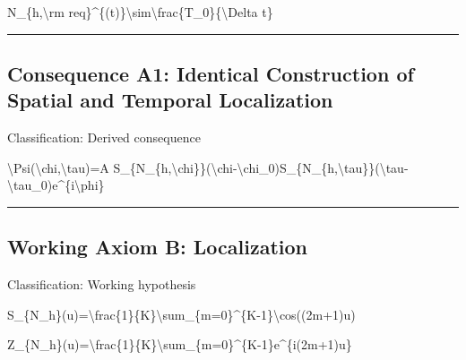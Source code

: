 \documentclass[
  a4paper]{article}
\newenvironment{Shaded}{}{}
\newcommand{\NormalTok}[1]{#1}
\begin{document}
\begin{Shaded}
\begin{Highlighting}[]
\NormalTok{N\_\{h,\textbackslash{}rm req\}\^{}\{(t)\}\textbackslash{}sim\textbackslash{}frac\{T\_0\}\{\textbackslash{}Delta t\}}
\end{Highlighting}
\end{Shaded}

\begin{center}\rule{0.5\linewidth}{0.5pt}\end{center}

\subsection{Consequence A1: Identical Construction of Spatial and
Temporal
Localization}\label{consequence-a1-identical-construction-of-spatial-and-temporal-localization}

Classification: Derived consequence

\begin{Shaded}
\begin{Highlighting}[]
\NormalTok{\textbackslash{}Psi(\textbackslash{}chi,\textbackslash{}tau)=A S\_\{N\_\{h,\textbackslash{}chi\}\}(\textbackslash{}chi{-}\textbackslash{}chi\_0)S\_\{N\_\{h,\textbackslash{}tau\}\}(\textbackslash{}tau{-}\textbackslash{}tau\_0)e\^{}\{i\textbackslash{}phi\}}
\end{Highlighting}
\end{Shaded}

\begin{center}\rule{0.5\linewidth}{0.5pt}\end{center}

\subsection{Working Axiom B:
Localization}\label{working-axiom-b-localization}

Classification: Working hypothesis

\begin{Shaded}
\begin{Highlighting}[]
\NormalTok{S\_\{N\_h\}(u)=\textbackslash{}frac\{1\}\{K\}\textbackslash{}sum\_\{m=0\}\^{}\{K{-}1\}\textbackslash{}cos((2m+1)u)}
\end{Highlighting}
\end{Shaded}

\begin{Shaded}
\begin{Highlighting}[]
\NormalTok{Z\_\{N\_h\}(u)=\textbackslash{}frac\{1\}\{K\}\textbackslash{}sum\_\{m=0\}\^{}\{K{-}1\}e\^{}\{i(2m+1)u\}}
\end{Highlighting}
\end{Shaded}
\end{document}
